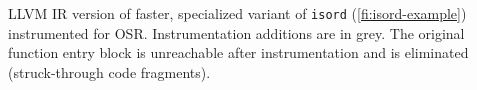 \label{fig:isordascto} LLVM IR version of faster, specialized variant of {\tt isord} (\myfigure\ref{fi:isord-example}) instrumented for OSR. Instrumentation additions are in grey. The original function entry block is unreachable after instrumentation and is eliminated (struck-through code fragments).
